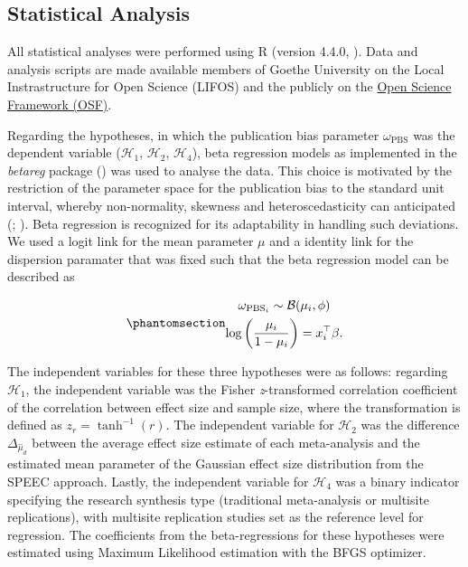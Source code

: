 \documentclass[
  12pt,
]{scrartcl}
\newcommand{\pbs}{\omega_{\text{PBS}}}
\begin{document}
\subsection{Statistical Analysis}\label{statistical-analysis}

All statistical analyses were performed using R (version 4.4.0,
). Data and analysis
scripts are made available members of Goethe University on the Local
Instrastructure for Open Science (LIFOS) and the publicly on the
\href{https://osf.io/87m9k/?view_only=030c8d1c46474270b5886c4dfc491a78}{Open
Science Framework (OSF)}.

Regarding the hypotheses, in which the publication bias parameter
\(\pbs\) was the dependent variable (\(\mathcal{H}_1\),
\(\mathcal{H}_2\), \(\mathcal{H}_4\)), beta regression models as
implemented in the \emph{betareg} package
() was used to
analyse the data. This choice is motivated by the restriction of the
parameter space for the publication bias to the standard unit interval,
whereby non-normality, skewness and heteroscedasticity can anticipated
(;
). Beta
regression is recognized for its adaptability in handling such
deviations. We used a logit link for the mean parameter \(\mu\) and a
identity link for the dispersion paramater that was fixed such that the
beta regression model can be described as

\begin{equation}\phantomsection\label{eq-beta-reg}{
\begin{gathered}
\omega_{\text{PBS}_i} \sim  \mathcal{B}(\mu_i, \phi) \\
\log{\bigg(\frac{\mu_i}{1 - \mu_i}\bigg)}=x_i^\top\beta.
\end{gathered}
}\end{equation}

The independent variables for these three hypotheses were as follows:
regarding \(\mathcal{H}_1\), the independent variable was the Fisher
\emph{z}-transformed correlation coefficient of the correlation between
effect size and sample size, where the transformation is defined as
\(z_r=\tanh^{-1}(r)\). The independent variable for \(\mathcal{H}_2\)
was the difference \(\Delta_{\widehat{\mu}_d}\) between the average
effect size estimate of each meta-analysis and the estimated mean
parameter of the Gaussian effect size distribution from the SPEEC
approach. Lastly, the independent variable for \(\mathcal{H}_4\) was a
binary indicator specifying the research synthesis type (traditional
meta-analysis or multisite replications), with multisite replication
studies set as the reference level for regression. The coefficients from
the beta-regressions for these hypotheses were estimated using Maximum
Likelihood estimation with the BFGS optimizer.
\end{document}
